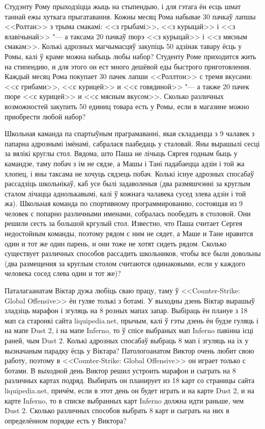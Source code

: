 \documentclass[11pt, a4paper]{article}
\begin{document}
\begin{problemList}
\bigskip

\problemItemSimple
{Студэнту Рому прыходзіцца жыць на стыпендыю, і для гэтага ён есць шмат таннай ежы хуткага прыгатавання.
Кожны месяц Рома набывае 30 пачкаў лапшы <<Ролтан>> з трыма смакамі:
<<з грыбамі>>, <<з курыцай>> і <<з ялавічынай>> "--- а таксама 20 пачкаў пюрэ <<з курыцай>> і <<з мясным смакам>>.
Колькі адрозных магчымасцяў закупіць 50 адзінак тавару ёсць у Ромы, калі ў краме можна набыць любы набор?}
{Студенту Роме приходится жить на стипендию, и для этого он ест много дешёвой еды быстрого приготовления.
Каждый месяц Рома покупает 30 пачек лапши <<Роллтон>> с тремя вкусами:
<<с грибами>>, <<с курицей>> и <<с говядиной>> "--- а также 20 пачек пюре <<с курицей>> и <<с мясным вкусом>>.
Сколько различных возможностей закупить 50 единиц товара есть у Ромы, если в магазине можно приобрести любой набор?}

\bigskip

\problemItemSimple
{Школьная каманда па спартыўным праграмаванні, якая складаецца з 9 чалавек з папарна адрознымі імёнамі, сабралася паабедаць у сталовай.
Яны вырашылі сесці за вялікі круглы стол. Вядома, што Паша не лічыць Сяргея годным быць у камандзе, 
таму побач з ім не сядзе, а Машы і Тані падабаецца адзін і той жа хлопец, і яны таксама не хочуць сядзець побач.
Колькі існуе адрозных спосабаў рассадзіць школьнікаў, каб усе былі задаволеныя
(два размяшчэнні за круглым сталом лічацца аднолькавымі,
калі ў кожнага чалавека сусед злева адзін і той жа).}
{Школьная команда по спортивному программированию, состоящая из 9 человек с попарно различными именами, собралась пообедать в столовой.
Они решили сесть за большой кргулый стол. Известно, что Паша считает Сергея недостойным команды, поэтому рядом с ним не сядет,
а Маше и Тане нравится один и тот же один парень, и они тоже не хотят сидеть рядом.
Сколько существует различных способов рассадить школьников, чтобы все были довольны
(два размещения за круглым столом считаются одинаковыми, если у каждого человека сосед слева один и тот же)?}

\bigskip

\problemItemSimple
{Паталагаанатам Віктар дужа любіць сваю працу, таму ў <<Counter-Strike: Global Offensive>> ён гуляе толькі з ботамі.
У выходны дзень Віктар вырашыў зладзіць марафон і згуляць на 8 розных мапах запар.
Выбіраць ён плануе з 18 мап са старонкі сайта liquipedia.net, прычым, калі ў гэты дзень ён будзе гуляць і на мапе Dust 2, і на мапе Inferno,
то ў спісе выбраных мап Inferno павінна ісці раней, чым Dust 2.
Колькі адрозных спосабаў выбраць 8 мап і згуляць на іх у вызначаным парадку ёсць у Віктара?}
{Патологоанатом Виктор очень любит свою работу, поэтому в <<Counter-Strike: Global Offensive>> он играет только с ботами.
В выходной день Виктор решил устроить марафон и сыграть на 8 различных картах подряд.
Выбирать он планирует из 18 карт со страницы сайта liquipedia.net, причём, если в этот день он будет играть и на карте Dust 2, и на карте Inferno,
то в списке выбранных карт Inferno должна идти раньше, чем Dust 2.
Сколько различных способов выбрать 8 карт и сыграть на них в определённом порядке есть у Виктора?}

\end{problemList}
\end{document}
